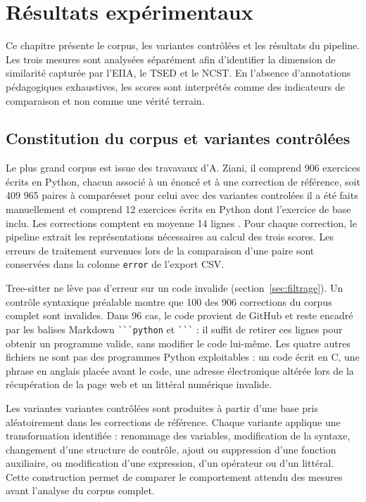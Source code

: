 \documentclass[12pt,a4paper,oneside]{report}
\begin{document}

\chapter{Résultats expérimentaux}
\label{chap:resultats}

Ce chapitre présente le corpus, les variantes contrôlées et les résultats du
pipeline. Les trois mesures sont analysées séparément afin d'identifier la
dimension de similarité capturée par l'EIIA, le TSED et le NCST. En l'absence
d'annotations pédagogiques exhaustives, les scores sont interprétés comme des
indicateurs de comparaison et non comme une vérité terrain.

\section{Constitution du corpus et variantes contrôlées}

Le  plus grand corpus  est issue des travavaux d'A. Ziani, il  comprend  906 exercices écrits en Python, chacun associé à un
énoncé et à une correction de référence, soit 409 965 paires à comparéeset pour  celui 
avec des variantes controlées il a été faits manuellement et  comprend 12 exercices écrits en Python dont l'exercice de base inclu.
Les corrections comptent en moyenne 14  lignes .
Pour chaque correction, le pipeline extrait les représentations nécessaires au
calcul des trois scores. Les erreurs de traitement survenues lors de la
comparaison d'une paire sont conservées dans la colonne \texttt{error} de
l'export CSV.

Tree-sitter ne lève pas d'erreur sur un code invalide
(section~\ref{sec:filtrage}). Un contrôle syntaxique préalable montre que
100 des 906 corrections du corpus complet sont invalides. Dans 96 cas, le
code provient de GitHub et reste encadré par les balises Markdown
\verb|```python| et \verb|```| : il suffit de retirer ces lignes pour
obtenir un programme valide, sans modifier le code lui-même. Les quatre
autres fichiers ne sont pas des programmes Python exploitables : un code
écrit en C, une phrase en anglais placée avant le code, une adresse
électronique altérée lors de la récupération de la page web et un littéral
numérique invalide.

Les variantes variantes contrôlées sont produites à partir d'une base pris aléatoirement dans les  corrections de référence.
Chaque variante applique une transformation identifiée : renommage des
variables, modification de la syntaxe, changement d'une structure de contrôle,
ajout ou suppression d'une fonction auxiliaire, ou modification d'une
expression, d'un opérateur ou d'un littéral. Cette construction permet de
comparer le comportement attendu des mesures avant l'analyse du corpus complet.
\end{document}
